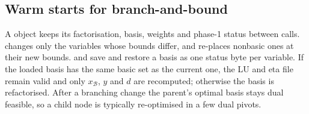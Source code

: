 \subsection{Warm starts for branch-and-bound}
A  object keeps its factorisation, basis, weights and phase-1 status between calls.
 changes only the variables whose bounds differ, and re-places
nonbasic ones at their new bounds.  and  save and restore a basis as
one status byte per variable. If the loaded basis has the same basic set as the current one, the
LU and eta file remain valid and only $x_{\mathcal B}$, $y$ and $d$ are recomputed; otherwise the
basis is refactorised. After a branching change the parent's optimal basis stays dual feasible, so a
child node is typically re-optimised in a few dual pivots.
